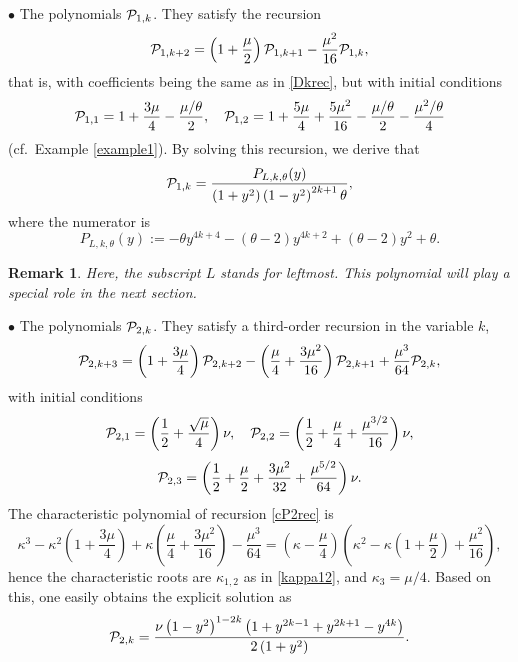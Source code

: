 \documentclass[smallextended,numbook,runningheads]{svjour3}     %
\newtheorem{remark}{Remark}
\newtheorem{remark}{Remark}
\newcommand{\te}{\theta}
\newcommand{\Pol}{P_{L,k,\te}(y)}
\newcommand{\cP}{{\cal{P}}}
\begin{document}
$\bullet$  The polynomials $\cP_{1,k}$. They satisfy the recursion 
\[
\cP_{1,k+2}=\left(1+\frac{\mu}{2}\right)\cP_{1,k+1}-\frac{\mu^2}{16}\cP_{1,k},
\]
that is, with coefficients being the same as in \eqref{Dkrec}, but with initial conditions
\[
\cP_{1,1}=1+\frac{3 \mu }{4}-\frac{\mu /\theta}{2  }, \quad \cP_{1,2}=1+\frac{5 \mu }{4}+\frac{5 \mu ^2}{16}-\frac{\mu/\theta }{2  }-\frac{\mu ^2/\theta}{4  }
\]
(cf.~Example \ref{example1}). By solving this recursion, we derive that
\begin{equation}\label{P1kexpl}
\cP_{1,k}=\frac{\Pol}{  \left(1+y^2\right)\left(1-y^2\right)^{2 k+1}\theta},
\end{equation}
where the numerator is 
\begin{equation}\label{poldef}
\Pol:=-\theta  y^{4 k+4}-(\theta -2) y^{4 k+2}+(\theta -2) y^2+\theta.
\end{equation}
\begin{remark}
Here, the subscript $L$ stands for \emph{leftmost}. This polynomial will play a special role in the next section.
\end{remark}


$\bullet$  The polynomials $\cP_{2,k}$. They satisfy a third-order recursion in the variable $k$,
\begin{equation}\label{cP2rec}
\cP_{2,k+3}=\left(1+\frac{3\mu}{4}\right)\cP_{2,k+2}-\left(\frac{\mu }{4}+\frac{3 \mu ^2}{16}\right)\cP_{2,k+1}+\frac{\mu ^3}{64}\cP_{2,k},
\end{equation}
with initial conditions 
\[
\cP_{2,1}=\left(\frac{1}{2}+\frac{\sqrt{\mu }}{4}\right) \nu, \quad \cP_{2,2}=\left(\frac{1}{2}+\frac{\mu }{4}+\frac{\mu ^{3/2}}{16}\right) \nu,
\]
\[
\cP_{2,3}=\left(\frac{1}{2}+\frac{\mu }{2}+\frac{3 \mu ^2}{32}+\frac{\mu ^{5/2}}{64}\right) \nu.
\]
The  characteristic polynomial of recursion \eqref{cP2rec} is 
\[
\kappa ^3-\kappa ^2 \left(1+\frac{3 \mu }{4}\right)+\kappa  \left(\frac{\mu }{4}+\frac{3 \mu ^2}{16}\right)-\frac{\mu ^3}{64}=\left(\kappa-\frac{\mu }{4}\right)\left(\kappa ^2-\kappa  \left(1+\frac{\mu }{2}\right)+\frac{\mu ^2}{16}\right),
\]
hence the characteristic roots are $\kappa_{1,2}$ as in \eqref{kappa12}, and $\kappa_3={\mu }/{4}$. Based on this, one easily obtains the explicit solution as
\begin{equation}\label{cP2kexpl}
\cP_{2,k}=\frac{\nu  \left(1-y^2\right)^{1-2 k} \left(1+y^{2 k-1}+y^{2 k+1}-y^{4 k}\right)}{2 \left(1+y^2\right)}.
\end{equation}
\end{document}
